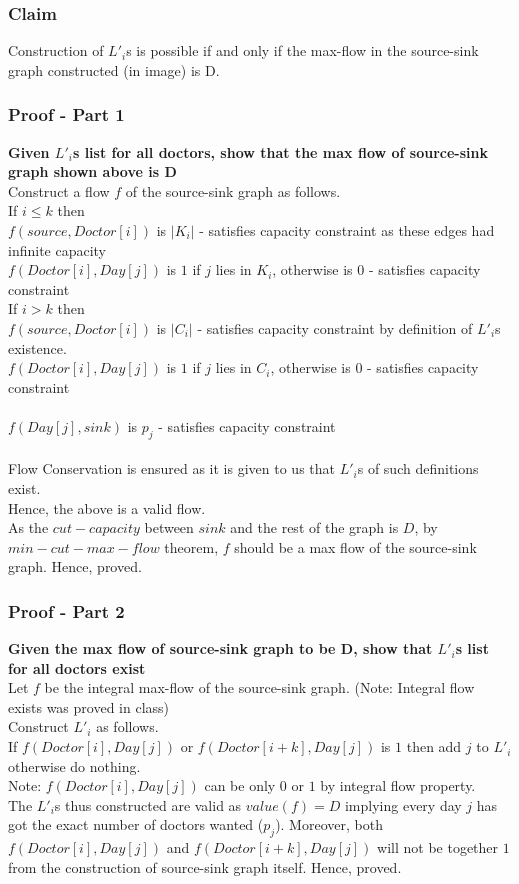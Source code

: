 \documentclass{article}
\begin{document}
\subsubsection{Claim}
Construction of $L'_i$s is possible if and only if the max-flow in the source-sink graph constructed (in image) is D.
\subsubsection{Proof - Part 1}
{\bf Given $L'_i$s list for all doctors, show that the max flow of source-sink graph shown above is D \\}
Construct a flow $f$ of the source-sink graph as follows. \\
If $i \leq k$ then \\
$f(source,Doctor[i])$ is $|K_i|$ - satisfies capacity constraint as these edges had infinite capacity \\
$f(Doctor[i], Day[j])$ is $1$ if $j$ lies in $K_i$, otherwise is $0$ - satisfies capacity constraint \\
If $i > k$ then \\
$f(source,Doctor[i])$ is $|C_i|$ - satisfies capacity constraint by definition of $L'_i$s existence. \\
$f(Doctor[i], Day[j])$ is $1$ if $j$ lies in $C_i$, otherwise is $0$ - satisfies capacity constraint \\
 \\
$f(Day[j],sink)$ is $p_j$ - satisfies capacity constraint \\
 \\
Flow Conservation is ensured as it is given to us that $L'_i$s of such definitions exist. \\
Hence, the above is a valid flow. \\
As the $cut-capacity$ between $sink$ and the rest of the graph is $D$, by $min-cut - max-flow$ theorem, $f$ should be a max flow of the source-sink graph. Hence, proved. 
\subsubsection{Proof - Part 2}
{\bf Given the max flow of source-sink graph to be D, show that $L'_i$s list for all doctors exist \\}
Let $f$ be the integral max-flow of the source-sink graph. (Note: Integral flow exists was proved in class) \\
Construct $L'_i$ as follows. \\
If $f(Doctor[i], Day[j])$ or $f(Doctor[i+k], Day[j])$ is $1$ then add $j$ to $L'_i$ otherwise do nothing. \\
Note: $f(Doctor[i], Day[j])$ can be only $0$ or $1$ by integral flow property. \\
The $L'_i$s thus constructed are valid as $value(f) = D$ implying every day $j$ has got the exact number of doctors wanted ($p_j$). Moreover, both $f(Doctor[i], Day[j])$ and $f(Doctor[i+k], Day[j])$ will not be together $1$ from the construction of source-sink graph itself. Hence, proved.
\end{document}
